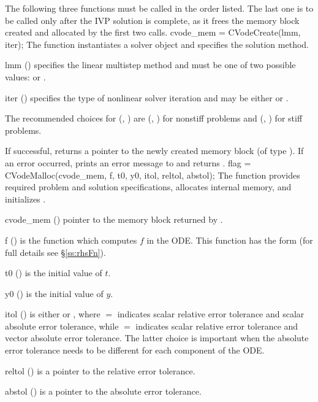 The following three functions must be called in the order listed. The last one
is to be called only after the IVP solution is complete, as it frees the
{\cvode} memory block created and allocated by the first two calls.
{
  cvode\_mem = CVodeCreate(lmm, iter);
}
{
  The function  instantiates a {\cvode} solver object and
  specifies the solution method.
}
{
  \begin{args}[iter]
  \item[lmm] ()
    specifies the linear multistep method and must be one of two
    possible values:  or .     
  \item[iter] ()
    specifies the type of nonlinear solver iteration and may be
    either  or . 
  \end{args}
  The recommended choices for (, ) are
  (, ) for nonstiff problems and
  (, ) for stiff problems.
}
{
  If successful,  returns a pointer to the newly created 
  {\cvode} memory block (of type ).
  If an error occurred,  prints an error message to 
  and returns .
}
{}
{
flag = CVodeMalloc(cvode\_mem, f, t0, y0, itol, reltol, abstol);
}
{
  The function  provides required problem and solution
  specifications, allocates internal memory, and initializes {\cvode}.
}
{
  \begin{args}
  \item[cvode\_mem] ()
    pointer to the {\cvode} memory block returned by .
  \item[f] ()
    is the {\C} function which computes $f$ in the ODE. This function has the 
    form  (for full details see \S\ref{ss:rhsFn}).
  \item[t0] ()
    is the initial value of $t$.
  \item[y0] ()
    is the initial value of $y$. 
  \item[itol] () 
    is either  or , where $=$ indicates
    scalar relative error tolerance and scalar absolute error tolerance, while
    $=$ indicates scalar relative error tolerance and vector
    absolute error tolerance.  The latter choice is important when the absolute
    error tolerance needs to be different for each component of the ODE. 
  \item[reltol] ()
    is a pointer to the relative error tolerance.
  \item[abstol] ()
    is a pointer to the absolute error tolerance.
  \end{args}
}
